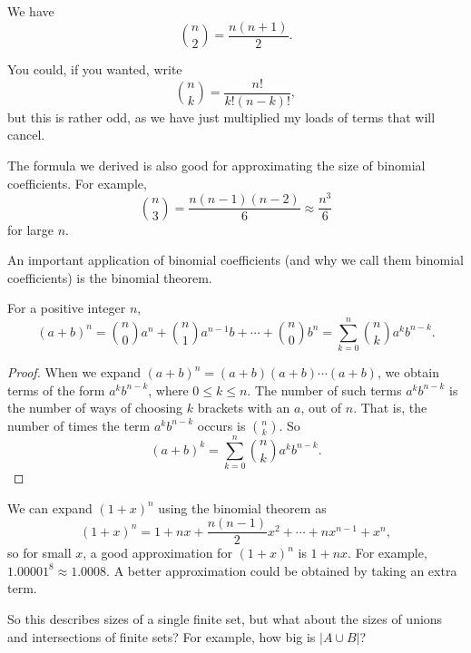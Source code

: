\documentclass[a4paper]{scrreprt}
\begin{document}
\begin{example}
	We have
	$$
	\binom{n}{2} = \frac{n(n + 1)}{2}.
	$$
\end{example}

\begin{remark}
	You could, if you wanted, write
$$
\binom{n}{k} = \frac{n!}{k!(n - k)!},
$$
but this is rather odd, as we have just multiplied my loads of terms that will cancel.
\end{remark}

The formula we derived is also good for approximating the size of binomial coefficients. For example,
$$
\binom{n}{3} = \frac{n(n - 1)(n - 2)}{6} \approx \frac{n^3}{6}
$$
for large $n$.


An important application of binomial coefficients (and why we call them binomial coefficients) is the binomial theorem.

\begin{theorem}
	For a positive integer $n$,
	$$
	(a + b)^n = \binom{n}{0}a^n + \binom{n}{1}a^{n - 1}b + \cdots + \binom{n}{0}b^n = \sum_{k = 0}^{n}\binom{n}{k}a^{k}b^{n - k}.
	$$
\end{theorem}
\begin{proof}
	When we expand $(a + b)^n = (a + b)(a + b)\cdots(a + b)$, we obtain terms of the form $a^k b^{n - k}$, where $0 \leq k \leq n$. The number of such terms $a^k b^{n - k}$ is the number of ways of choosing $k$ brackets with an $a$, out of $n$. That is, the number of times the term $a^k b^{n - k}$ occurs is $\binom{n}{k}$. So
	$$
	(a + b)^k = \sum_{k = 0}^{n}\binom{n}{k}a^{k}b^{n - k}.
	$$
\end{proof}

\begin{example}
	We can expand $(1 + x)^n$ using the binomial theorem as
	$$
	(1 + x)^n = 1 + nx + \frac{n(n - 1)}{2}x^2 + \cdots + n x^{n - 1} + x^n,
	$$
	so for small $x$, a good approximation for $(1 + x)^n$ is $1 + nx$. For example, $1.00001^8 \approx 1.0008$. A better approximation could be obtained by taking an extra term.
\end{example}

So this describes sizes of a single finite set, but what about the sizes of unions and intersections of finite sets? For example, how big is $|A \cup B|$?
\end{document}
